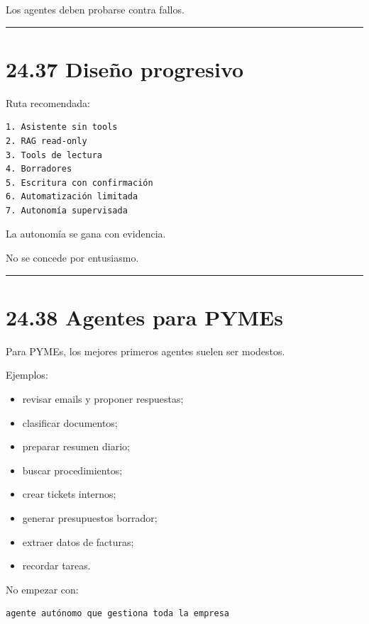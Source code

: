 Los agentes deben probarse contra fallos.

\begin{center}\rule{0.5\linewidth}{0.5pt}\end{center}

\section{24.37 Diseño progresivo}\label{diseuxf1o-progresivo}

Ruta recomendada:

\begin{lstlisting}
1. Asistente sin tools
2. RAG read-only
3. Tools de lectura
4. Borradores
5. Escritura con confirmación
6. Automatización limitada
7. Autonomía supervisada
\end{lstlisting}

La autonomía se gana con evidencia.

No se concede por entusiasmo.

\begin{center}\rule{0.5\linewidth}{0.5pt}\end{center}

\section{24.38 Agentes para PYMEs}\label{agentes-para-pymes}

Para PYMEs, los mejores primeros agentes suelen ser modestos.

Ejemplos:

\begin{itemize}
\tightlist
\item
  revisar emails y proponer respuestas;
\item
  clasificar documentos;
\item
  preparar resumen diario;
\item
  buscar procedimientos;
\item
  crear tickets internos;
\item
  generar presupuestos borrador;
\item
  extraer datos de facturas;
\item
  recordar tareas.
\end{itemize}

No empezar con:

\begin{lstlisting}
agente autónomo que gestiona toda la empresa
\end{lstlisting}

